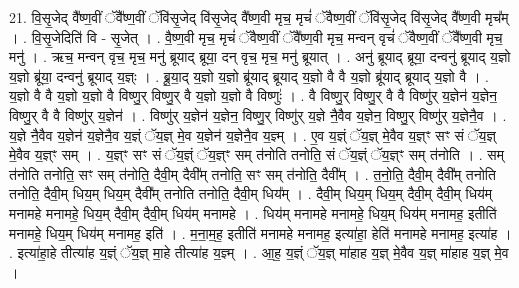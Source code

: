 \documentclass[17pt]{extarticle}
\begin{document}
21. वि॒सृ॒जेद् वै᳚ष्ण॒वीं ॅवै᳚ष्ण॒वीं ॅवि॑सृ॒जेद् वि॑सृ॒जेद् वै᳚ष्ण॒वी मृच॒ मृचं॑ ॅवैष्ण॒वीं ॅवि॑सृ॒जेद् वि॑सृ॒जेद् वै᳚ष्ण॒वी मृच᳚म् । . वि॒सृ॒जेदिति॑ वि - सृ॒जेत् । . वै॒ष्ण॒वी मृच॒ मृचं॑ ॅवैष्ण॒वीं ॅवै᳚ष्ण॒वी मृच॒ मन्वन् वृचं॑ ॅवैष्ण॒वीं ॅवै᳚ष्ण॒वी मृच॒ मनु॑ । . ऋच॒ मन्वन् वृच॒ मृच॒ मनु॑ ब्रूयाद् ब्रूया॒ दन् वृच॒ मृच॒ मनु॑ ब्रूयात् । . अनु॑ ब्रूयाद् ब्रूया॒ दन्वनु॑ ब्रूयाद् य॒ज्ञो य॒ज्ञो ब्रू॑या॒ दन्वनु॑ ब्रूयाद् य॒ज्ञ्ः । . ब्रू॒या॒द् य॒ज्ञो य॒ज्ञो ब्रू॑याद् ब्रूयाद् य॒ज्ञो वै वै य॒ज्ञो ब्रू॑याद् ब्रूयाद् य॒ज्ञो वै । . य॒ज्ञो वै वै य॒ज्ञो य॒ज्ञो वै विष्णु॒र् विष्णु॒र् वै य॒ज्ञो य॒ज्ञो वै विष्णुः॑ । . वै विष्णु॒र् विष्णु॒र् वै वै विष्णु॑र् य॒ज्ञेन॑ य॒ज्ञेन॒ विष्णु॒र् वै वै विष्णु॑र् य॒ज्ञेन॑ । . विष्णु॑र् य॒ज्ञेन॑ य॒ज्ञेन॒ विष्णु॒र् विष्णु॑र् य॒ज्ञे नै॒वैव य॒ज्ञेन॒ विष्णु॒र् विष्णु॑र् य॒ज्ञेनै॒व । . य॒ज्ञे नै॒वैव य॒ज्ञेन॑ य॒ज्ञेनै॒व य॒ज्ञ्ं ॅय॒ज्ञ् मे॒व य॒ज्ञेन॑ य॒ज्ञेनै॒व य॒ज्ञ्म् । . ए॒व य॒ज्ञ्ं ॅय॒ज्ञ् मे॒वैव य॒ज्ञ्ꣳ सꣳ सं ॅय॒ज्ञ् मे॒वैव य॒ज्ञ्ꣳ सम् । . य॒ज्ञ्ꣳ सꣳ सं ॅय॒ज्ञ्ं ॅय॒ज्ञ्ꣳ सम् त॑नोति तनोति॒ सं ॅय॒ज्ञ्ं ॅय॒ज्ञ्ꣳ सम् त॑नोति । . सम् त॑नोति तनोति॒ सꣳ सम् त॑नोति॒ दैवी॒म् दैवी᳚म् तनोति॒ सꣳ सम् त॑नोति॒ दैवी᳚म् । . त॒नो॒ति॒ दैवी॒म् दैवी᳚म् तनोति तनोति॒ दैवी॒म् धिय॒म् धिय॒म् दैवी᳚म् तनोति तनोति॒ दैवी॒म् धिय᳚म् । . दैवी॒म् धिय॒म् धिय॒म् दैवी॒म् दैवी॒म् धिय॑म् मनामहे मनामहे॒ धिय॒म् दैवी॒म् दैवी॒म् धिय॑म् मनामहे । . धिय॑म् मनामहे मनामहे॒ धिय॒म् धिय॑म् मनामह॒ इतीति॑ मनामहे॒ धिय॒म् धिय॑म् मनामह॒ इति॑ । . म॒ना॒म॒ह॒ इतीति॑ मनामहे मनामह॒ इत्या॑हा॒ हेति॑ मनामहे मनामह॒ इत्या॑ह । . इत्या॑हा॒हे तीत्या॑ह य॒ज्ञ्ं ॅय॒ज्ञ् मा॒हे तीत्या॑ह य॒ज्ञ्म् । . आ॒ह॒ य॒ज्ञ्ं ॅय॒ज्ञ् मा॑हाह य॒ज्ञ् मे॒वैव य॒ज्ञ् मा॑हाह य॒ज्ञ् मे॒व । \newline
\end{document}
